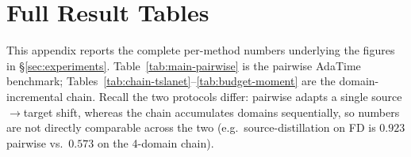%

\section{Full Result Tables}
\label{app:full-tables}
This appendix reports the complete per-method numbers underlying the
figures in \S\ref{sec:experiments}. Table~\ref{tab:main-pairwise} is the
pairwise AdaTime benchmark; Tables~\ref{tab:chain-tslanet}--\ref{tab:budget-moment}
are the domain-incremental chain. Recall the two protocols differ: pairwise
adapts a single source$\rightarrow$target shift, whereas the chain
accumulates domains sequentially, so numbers are not directly comparable
across the two (e.g.\ source-distillation on FD is $0.923$ pairwise vs.\
$0.573$ on the 4-domain chain).

